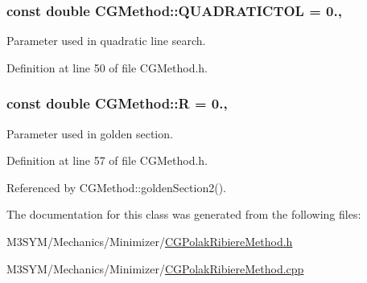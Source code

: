 \hypertarget{classCGMethod_acd9c51fe93f6d563f731dd2e30eb7922}{
\subsubsection[{Q\+U\+A\+D\+R\+A\+T\+I\+C\+T\+O\+L}]{\setlength{\rightskip}{0pt plus 5cm}const double C\+G\+Method\+::\+Q\+U\+A\+D\+R\+A\+T\+I\+C\+T\+O\+L = 0.\hspace{0.3cm}{\ttfamily [protected]}, {\ttfamily [inherited]}}}\label{classCGMethod_acd9c51fe93f6d563f731dd2e30eb7922}


Parameter used in quadratic line search. 



Definition at line 50 of file C\+G\+Method.\+h.

\hypertarget{classCGMethod_a2e7906b4b29a1b76dca43d56eaf2efac}{
\subsubsection[{R}]{\setlength{\rightskip}{0pt plus 5cm}const double C\+G\+Method\+::\+R = 0.\hspace{0.3cm}{\ttfamily [protected]}, {\ttfamily [inherited]}}}\label{classCGMethod_a2e7906b4b29a1b76dca43d56eaf2efac}


Parameter used in golden section. 



Definition at line 57 of file C\+G\+Method.\+h.



Referenced by C\+G\+Method\+::golden\+Section2().



The documentation for this class was generated from the following files\+:\begin{DoxyCompactItemize}
\item 
M3\+S\+Y\+M/\+Mechanics/\+Minimizer/\hyperlink{CGPolakRibiereMethod_8h}{C\+G\+Polak\+Ribiere\+Method.\+h}\item 
M3\+S\+Y\+M/\+Mechanics/\+Minimizer/\hyperlink{CGPolakRibiereMethod_8cpp}{C\+G\+Polak\+Ribiere\+Method.\+cpp}\end{DoxyCompactItemize}
